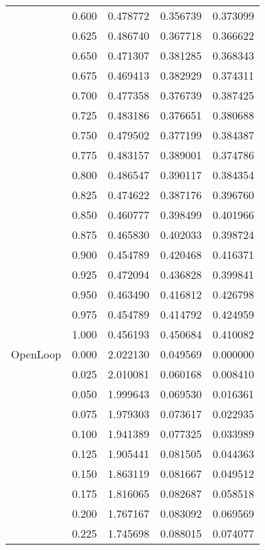 \begin{tabular}{llrrr}
         & 0.600 &   0.478772 &   0.356739 &   0.373099 \\
         & 0.625 &   0.486740 &   0.367718 &   0.366622 \\
         & 0.650 &   0.471307 &   0.381285 &   0.368343 \\
         & 0.675 &   0.469413 &   0.382929 &   0.374311 \\
         & 0.700 &   0.477358 &   0.376739 &   0.387425 \\
         & 0.725 &   0.483186 &   0.376651 &   0.380688 \\
         & 0.750 &   0.479502 &   0.377199 &   0.384387 \\
         & 0.775 &   0.483157 &   0.389001 &   0.374786 \\
         & 0.800 &   0.486547 &   0.390117 &   0.384354 \\
         & 0.825 &   0.474622 &   0.387176 &   0.396760 \\
         & 0.850 &   0.460777 &   0.398499 &   0.401966 \\
         & 0.875 &   0.465830 &   0.402033 &   0.398724 \\
         & 0.900 &   0.454789 &   0.420468 &   0.416371 \\
         & 0.925 &   0.472094 &   0.436828 &   0.399841 \\
         & 0.950 &   0.463490 &   0.416812 &   0.426798 \\
         & 0.975 &   0.454789 &   0.414792 &   0.424959 \\
         & 1.000 &   0.456193 &   0.450684 &   0.410082 \\
OpenLoop & 0.000 &   2.022130 &   0.049569 &   0.000000 \\
         & 0.025 &   2.010081 &   0.060168 &   0.008410 \\
         & 0.050 &   1.999643 &   0.069530 &   0.016361 \\
         & 0.075 &   1.979303 &   0.073617 &   0.022935 \\
         & 0.100 &   1.941389 &   0.077325 &   0.033989 \\
         & 0.125 &   1.905441 &   0.081505 &   0.044363 \\
         & 0.150 &   1.863119 &   0.081667 &   0.049512 \\
         & 0.175 &   1.816065 &   0.082687 &   0.058518 \\
         & 0.200 &   1.767167 &   0.083092 &   0.069569 \\
         & 0.225 &   1.745698 &   0.088015 &   0.074077 \\

\end{tabular}
